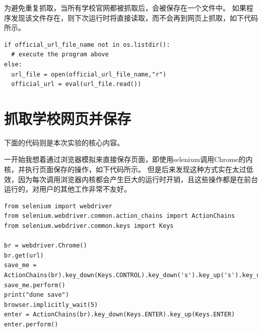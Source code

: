 \documentclass[logo,reportComp]{thesis}
\begin{document}
为避免重复抓取，当所有学校官网都被抓取后，会被保存在一个文件中。
如果程序发现该文件存在，则下次运行时将直接读取，而不会再到网页上抓取，如下代码所示。
\begin{lstlisting}
if official_url_file_name not in os.listdir():
  # execute the program above
else:
  url_file = open(official_url_file_name,"r")
  official_url = eval(url_file.read())
\end{lstlisting}

\section{抓取学校网页并保存}
下面的代码则是本次实验的核心内容。

一开始我想着通过浏览器模拟来直接保存页面，即使用selenium调用Chrome的内核，并执行页面保存的操作，如下代码所示。
但是后来发现这种方式实在太过低效，因为每次调用浏览器内核都会产生巨大的运行时开销，且这些操作都是在前台运行的，对用户的其他工作非常不友好。
\begin{lstlisting}
from selenium import webdriver
from selenium.webdriver.common.action_chains import ActionChains
from selenium.webdriver.common.keys import Keys

br = webdriver.Chrome()
br.get(url)
save_me = ActionChains(br).key_down(Keys.CONTROL).key_down('s').key_up('s').key_up(Keys.CONTROL)
save_me.perform()
print("done save")
browser.implicitly_wait(5)
enter = ActionChains(br).key_down(Keys.ENTER).key_up(Keys.ENTER)
enter.perform()
\end{lstlisting}
\end{document}
